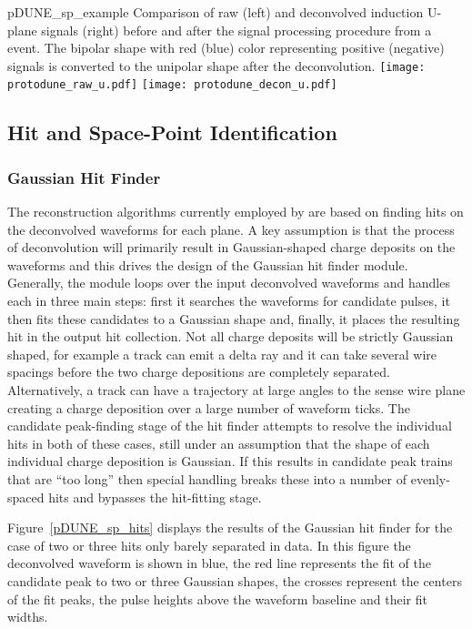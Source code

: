 \begin{dunefigure}
{pDUNE_sp_example}
{Comparison of raw (left) and deconvolved induction U-plane signals (right) before and after 
the signal processing procedure from a  event. The bipolar shape with red (blue) color representing
positive (negative) signals is converted to the unipolar shape after the \twod deconvolution.}
\texttt{[image: protodune\_raw\_u.pdf]}
\texttt{[image: protodune\_decon\_u.pdf]}\end{dunefigure}


\subsection{Hit and Space-Point Identification}

\subsubsection{Gaussian Hit Finder}\label{sec:gaushit}

The reconstruction algorithms currently employed by \larsoft are based on finding hits on the deconvolved waveforms for each plane. A key assumption is that the process of deconvolution will primarily result in Gaussian-shaped charge deposits on the waveforms and this drives the design of the Gaussian hit finder module. Generally, the module loops over the input deconvolved waveforms and handles each in three main steps: first it searches the waveforms %
for candidate pulses, it then fits these candidates %
to a Gaussian shape and, finally, it places the resulting hit %
in the output hit collection. Not all charge deposits will be strictly Gaussian shaped, for example a track can emit a delta ray and it can take several wire spacings before the two charge depositions are %
completely separated. Alternatively, a track can have a trajectory at large angles to the sense wire plane creating a charge deposition over a large number of waveform ticks. The candidate peak-finding stage of the hit finder attempts to resolve the individual hits in both of these cases, still under an assumption that the shape of each individual charge deposition is %
Gaussian. If this results in candidate peak trains that are ``too long'' then special handling  breaks these into a number of evenly-spaced hits and bypasses the hit-fitting stage. 

Figure~\ref{pDUNE_sp_hits} displays the results of the Gaussian hit finder for the case of two or three hits only barely separated in  data. In this figure the deconvolved waveform is shown in blue, the red line represents the fit of the candidate peak to two or three Gaussian shapes, the crosses represent the centers of the fit peaks, the pulse heights above the waveform baseline and their fit widths. 

